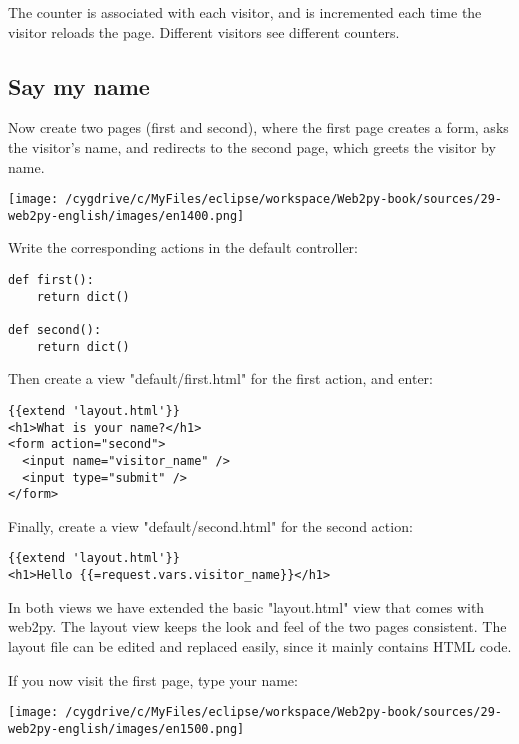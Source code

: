 \documentclass[justified,sixbynine,notoc]{tufte-book}
\def\inxx#1{\index{#1}}
\begin{document}
\begin{fullwidth}
The counter is associated with each visitor, and is incremented each time the visitor reloads the page. Different visitors see different counters.

\goodbreak\subsection{Say my name}

\inxx{form} \inxx{request.vars}

Now create two pages (first and second), where the first page creates a form, asks the visitor's name, and redirects to the second page, which greets the visitor by name.


\goodbreak\begin{center}\texttt{[image: /cygdrive/c/MyFiles/eclipse/workspace/Web2py-book/sources/29-web2py-english/images/en1400.png]}\end{center}


Write the corresponding actions in the default controller:
\begin{lstlisting}
def first():
    return dict()

def second():
    return dict()
\end{lstlisting}

Then create a view "default/first.html" for the first action,
and enter:
\begin{lstlisting}[keywords={}]
{{extend 'layout.html'}}
<h1>What is your name?</h1>
<form action="second">
  <input name="visitor_name" />
  <input type="submit" />
</form>
\end{lstlisting}

Finally, create a view "default/second.html" for the second action:
\begin{lstlisting}[keywords={}]
{{extend 'layout.html'}}
<h1>Hello {{=request.vars.visitor_name}}</h1>
\end{lstlisting}

\inxx{layout}
In both views we have extended the basic "layout.html" view that comes with web2py. The layout view keeps the look and feel of the two pages consistent. The layout file can be edited and replaced easily, since it mainly contains HTML code.

If you now visit the first page, type your name:


\goodbreak\begin{center}\texttt{[image: /cygdrive/c/MyFiles/eclipse/workspace/Web2py-book/sources/29-web2py-english/images/en1500.png]}\end{center}


\end{fullwidth}
\end{document}
